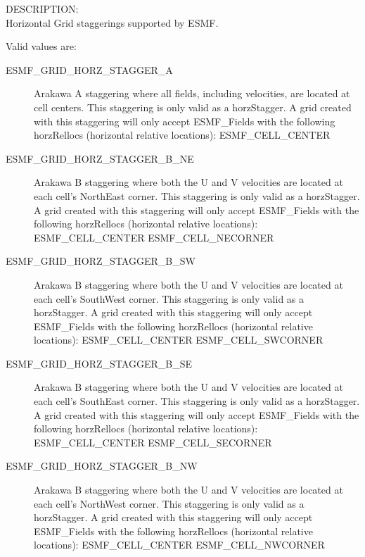 {\sf DESCRIPTION:\\}
Horizontal Grid staggerings supported by ESMF.

Valid values are:
\begin{description}
   \item [ESMF\_GRID\_HORZ\_STAGGER\_A]
         Arakawa A staggering where all fields, including velocities, are
         located at cell centers.  This staggering is only valid as a horzStagger.
         A grid created with this staggering will only accept ESMF\_Fields with
         the following horzRellocs (horizontal relative locations):
             ESMF\_CELL\_CENTER

   \item [ESMF\_GRID\_HORZ\_STAGGER\_B\_NE]
         Arakawa B staggering where both the U and V velocities are located at
         each cell's NorthEast corner.  This staggering is only valid as a
         horzStagger.  A grid created with this staggering will only accept
         ESMF\_Fields with the following horzRellocs (horizontal relative locations):
             ESMF\_CELL\_CENTER
             ESMF\_CELL\_NECORNER

   \item [ESMF\_GRID\_HORZ\_STAGGER\_B\_SW]
         Arakawa B staggering where both the U and V velocities are located at
         each cell's SouthWest corner.  This staggering is only valid as a 
         horzStagger.  A grid created with this staggering will only accept
         ESMF\_Fields with the following horzRellocs (horizontal relative locations):
             ESMF\_CELL\_CENTER
             ESMF\_CELL\_SWCORNER

   \item [ESMF\_GRID\_HORZ\_STAGGER\_B\_SE]
         Arakawa B staggering where both the U and V velocities are located at
         each cell's SouthEast corner.  This staggering is only valid as a 
         horzStagger.  A grid created with this staggering will only accept
         ESMF\_Fields with the following horzRellocs (horizontal relative locations):
             ESMF\_CELL\_CENTER
             ESMF\_CELL\_SECORNER

   \item [ESMF\_GRID\_HORZ\_STAGGER\_B\_NW]
         Arakawa B staggering where both the U and V velocities are located at
         each cell's NorthWest corner.  This staggering is only valid as a 
         horzStagger.  A grid created with this staggering will only accept
         ESMF\_Fields with the following horzRellocs (horizontal relative locations):
             ESMF\_CELL\_CENTER
             ESMF\_CELL\_NWCORNER


\end{description}
